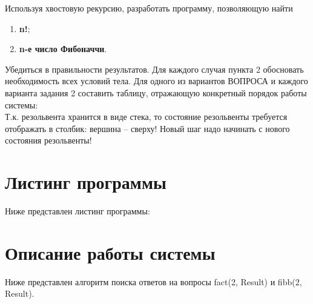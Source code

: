 \Large Используя хвостовую рекурсию, разработать программу, позволяющую найти 
\begin{enumerate}
	\item \textbf{n!};
	\item \textbf{n-е число Фибоначчи}.
\end{enumerate}

Убедиться в правильности результатов.
Для каждого случая пункта 2 обосновать необходимость всех условий тела. 
Для одного из вариантов ВОПРОСА и каждого варианта задания 2 составить таблицу, отражающую конкретный порядок работы системы: \\
Т.к. резольвента хранится в виде стека, то состояние резольвенты требуется отображать в столбик: вершина – сверху! Новый шаг надо начинать с нового состояния резольвенты!


\newpage
\section*{Листинг программы}
Ниже представлен листинг программы:


\section*{Описание работы системы}

Ниже представлен алгоритм поиска ответов на вопросы fact(2, Result) и fibb(2, Result).

